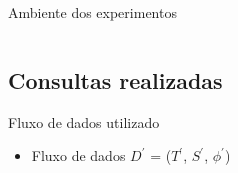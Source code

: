 \documentclass[12pt,compress,final]{beamer}
\newcommand{\nologo}{\setbeamertemplate{logo}{}} %
\begin{document}
\begin{frame}{Ambiente dos experimentos}
\begin{columns}[t]
\end{columns}


\end{frame}


\subsection*{Consultas realizadas}

{\nologo
\begin{frame}{Fluxo de dados utilizado}
\begin{itemize}
\item Fluxo de dados $D^{\prime}$ = ($T^{\prime}$, $S^{\prime}$, $\phi^{\prime}$)
\end{itemize}


\end{frame}}
\end{document}
